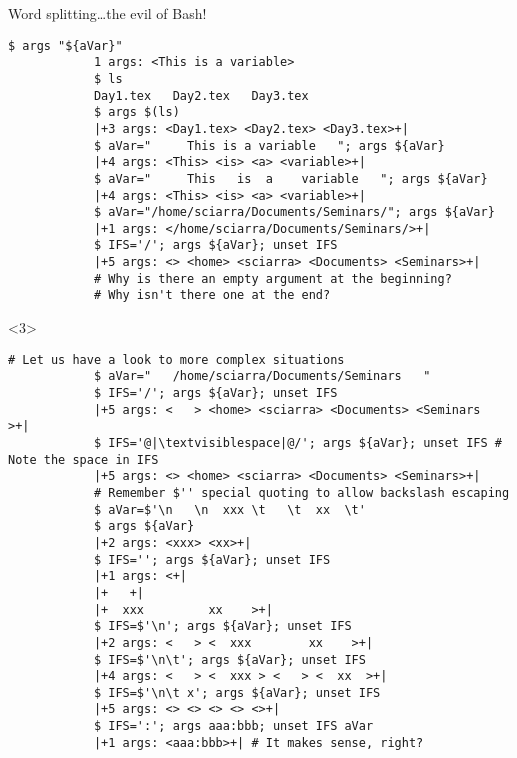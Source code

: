 \begin{frame}[fragile]{Word splitting}{\ldots{}the evil of Bash!}
\begin{onlyenv}
\begin{lstlisting}[style=MyBash, style=oddnumbers]
            $ args "${aVar}"
            1 args: <This is a variable>
            $ ls
            Day1.tex   Day2.tex   Day3.tex
            $ args $(ls)
            |+3 args: <Day1.tex> <Day2.tex> <Day3.tex>+|
            $ aVar="     This is a variable   "; args ${aVar}
            |+4 args: <This> <is> <a> <variable>+|
            $ aVar="     This   is  a    variable   "; args ${aVar}
            |+4 args: <This> <is> <a> <variable>+|
            $ aVar="/home/sciarra/Documents/Seminars/"; args ${aVar}
            |+1 args: </home/sciarra/Documents/Seminars/>+|
            $ IFS='/'; args ${aVar}; unset IFS
            |+5 args: <> <home> <sciarra> <Documents> <Seminars>+|
            # Why is there an empty argument at the beginning?
            # Why isn't there one at the end?
        \end{lstlisting}
    \end{onlyenv}
    \begin{onlyenv}<3>
        \begin{lstlisting}[style=MyBash, style=oddnumbers, firstnumber=22]
            # Let us have a look to more complex situations
            $ aVar="   /home/sciarra/Documents/Seminars   "
            $ IFS='/'; args ${aVar}; unset IFS
            |+5 args: <   > <home> <sciarra> <Documents> <Seminars   >+|
            $ IFS='@|\textvisiblespace|@/'; args ${aVar}; unset IFS # Note the space in IFS
            |+5 args: <> <home> <sciarra> <Documents> <Seminars>+|
            # Remember $'' special quoting to allow backslash escaping
            $ aVar=$'\n   \n  xxx \t   \t  xx  \t'
            $ args ${aVar}
            |+2 args: <xxx> <xx>+|
            $ IFS=''; args ${aVar}; unset IFS
            |+1 args: <+|
            |+   +|
            |+  xxx         xx    >+|
            $ IFS=$'\n'; args ${aVar}; unset IFS
            |+2 args: <   > <  xxx        xx    >+|
            $ IFS=$'\n\t'; args ${aVar}; unset IFS
            |+4 args: <   > <  xxx > <   > <  xx  >+|
            $ IFS=$'\n\t x'; args ${aVar}; unset IFS
            |+5 args: <> <> <> <> <>+|
            $ IFS=':'; args aaa:bbb; unset IFS aVar
            |+1 args: <aaa:bbb>+| # It makes sense, right?
        \end{lstlisting}
    \end{onlyenv}
\end{frame}
